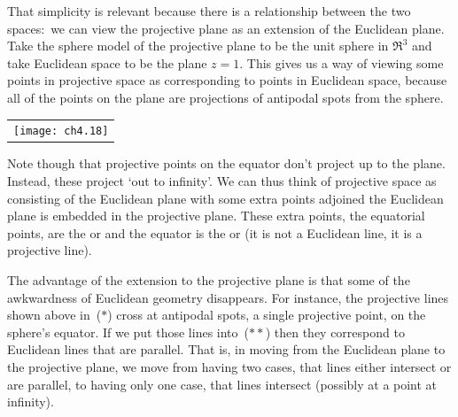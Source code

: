 That simplicity is relevant because there is a 
relationship between the two spaces:~we can view the 
projective plane as an extension of the Euclidean plane.
Take the sphere model of the projective plane to be the unit sphere in $\Re^3$
and take Euclidean space to be the plane $z=1$.
This gives us a way of viewing some points
in projective space as corresponding to points in Euclidean space,
because all of the points on the plane are projections of  
antipodal spots from the sphere.
\begin{center}
 \hfill
  \begin{tabular}{@{}c@{}}\texttt{[image: ch4.18]}\end{tabular}
 \hfill\llap{($**$)}
\end{center}
Note though that projective points on the equator don't project up to the 
plane.
Instead, these project `out to infinity'.
We can thus think of projective space as consisting of the Euclidean plane 
with some extra points adjoined \Dash  
the Euclidean plane is embedded in the projective plane.
These extra points, the equatorial points, are  
the %
or 
and the equator is the 
%
 or 
(it is not a Euclidean line, it is a projective line). 

The advantage of the extension to the projective plane
is that some of the awkwardness 
of Euclidean geometry disappears.
For instance, the projective lines shown above in~($*$) cross
at antipodal spots, a single projective point, on the sphere's equator.
If we put those lines into~($**$) then they correspond to Euclidean lines that
are parallel.
That is, in moving from the Euclidean plane to the projective plane, we move
from having two cases, 
that lines either intersect or are parallel, to having only
one case, that lines intersect (possibly at a point at infinity). 

